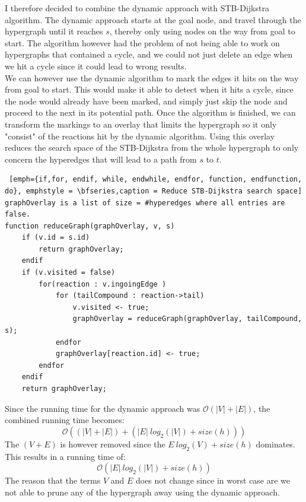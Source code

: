 \documentclass[a4paper,10pt,titlepage]{paper}
\begin{document}
I therefore decided to combine the dynamic approach with STB-Dijkstra algorithm. The dynamic approach starts at the goal node, and travel through the hypergraph until it reaches $s$, thereby only using nodes on the way from goal to start. The algorithm however had the problem of not being able to work on hypergraphs that contained a cycle, and we could not just delete an edge when we hit a cycle since it could lead to wrong results.\\
We can however use the dynamic algorithm to mark the edges it hits on the way from goal to start. This would make it able to detect when it hits a cycle, since the node would already have been marked, and simply just skip the node and proceed to the next in its potential path. Once the algorithm is finished, we can transform the markings to an overlay that limits the hypergraph so it only "consist" of the reactions hit by the dynamic algorithm. Using this overlay reduces the search space of the STB-Dijkstra from the whole hypergraph to only concern the hyperedges that will lead to a path from $s$ to $t$.
\begin{lstlisting} [emph={if,for, endif, while, endwhile, endfor, function, endfunction, do}, emphstyle = \bfseries,caption = Reduce STB-Dijkstra search space]
graphOverlay is a list of size = #hyperedges where all entries are false.
function reduceGraph(graphOverlay, v, s)
	if (v.id = s.id)
		return graphOverlay;
	endif
	if (v.visited = false) 
		for(reaction : v.ingoingEdge )
			for (tailCompound : reaction->tail) 
				v.visited <- true;
				graphOverlay = reduceGraph(graphOverlay, tailCompound, s);
			endfor
			graphOverlay[reaction.id] <- true;
		endfor
	endif
	return graphOverlay;
\end{lstlisting}
Since the running time for the dynamic approach was $\mathcal{O}(|V|+|E|)$, the combined running time becomes: 
\begin{equation}
\mathcal{O}((|V|+|E|)+(|E|\ log_2 (|V|) + size(h)))
\end{equation}
The $(V+E)$ is however removed since the $E\ log_2 (V) + size(h)$ dominates. This results in a running time of:
\begin{equation}
\mathcal{O}(|E|\ log_2 (|V|) + size(h))
\end{equation}
The reason that the terms $V$ and $E$ does not change since in worst case are we not able to prune any of the hypergraph away using the dynamic approach.
\end{document}
